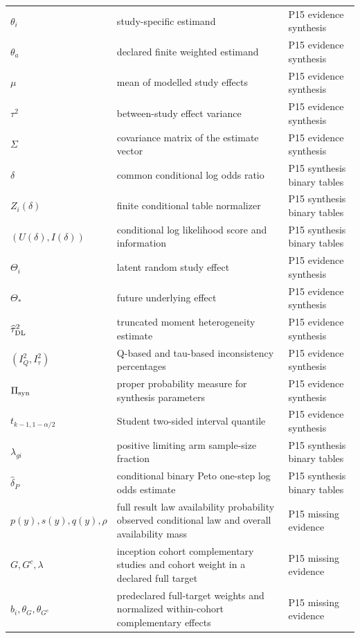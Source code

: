 \begin{longtable}{@{}p{}p{}p{}@{}}
\(\theta_i\) & study-specific estimand & P15 evidence synthesis \\
\(\theta_a\) & declared finite weighted estimand & P15 evidence synthesis \\
\(\mu\) & mean of modelled study effects & P15 evidence synthesis \\
\(\tau^2\) & between-study effect variance & P15 evidence synthesis \\
\(\Sigma\) & covariance matrix of the estimate vector & P15 evidence synthesis \\
\(\delta\) & common conditional log odds ratio & P15 synthesis binary tables \\
\(Z_i(\delta)\) & finite conditional table normalizer & P15 synthesis binary tables \\
\((U(\delta),\allowbreak I(\delta))\) & conditional log likelihood score and information & P15 synthesis binary tables \\
\(\Theta_i\) & latent random study effect & P15 evidence synthesis \\
\(\Theta_*\) & future underlying effect & P15 evidence synthesis \\
\(\widehat\tau_{\rm DL}^2\) & truncated moment heterogeneity estimate & P15 evidence synthesis \\
\((I_Q^2,\allowbreak I_\tau^2)\) & Q-based and tau-based inconsistency percentages & P15 evidence synthesis \\
\(\Pi_{\rm syn}\) & proper probability measure for synthesis parameters & P15 evidence synthesis \\
\(t_{k-1,1-\alpha/2}\) & Student two-sided interval quantile & P15 evidence synthesis \\
\(\lambda_{gi}\) & positive limiting arm sample-size fraction & P15 synthesis binary tables \\
\(\widehat\delta_P\) & conditional binary Peto one-step log odds estimate & P15 synthesis binary tables \\
\(p(y),\allowbreak s(y),\allowbreak q(y),\allowbreak \rho\) & full result law availability probability observed conditional law and overall availability mass & P15 missing evidence \\
\(G,\allowbreak G^c,\allowbreak \lambda\) & inception cohort complementary studies and cohort weight in a declared full target & P15 missing evidence \\
\(b_i,\allowbreak \theta_G,\allowbreak \theta_{G^c}\) & predeclared full-target weights and normalized within-cohort complementary effects & P15 missing evidence \\

\end{longtable}
